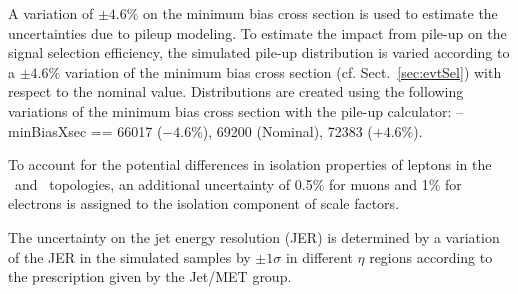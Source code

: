 A variation of $\pm 4.6\%$ on the minimum bias cross section is used to estimate the uncertainties due to pileup modeling.
To estimate the impact from pile-up on the signal selection efficiency, the simulated pile-up distribution is varied according to a $\pm 4.6\%$ variation of the minimum bias cross section (cf. Sect.~\ref{sec:evtSel}) with respect to the nominal value. 
Distributions are created using the following variations of the minimum bias cross section with the pile-up calculator: --minBiasXsec ==  66017 ($-4.6\%$), 69200 (Nominal), 72383 ($+4.6\%$).


To account for the potential differences in isolation properties of leptons in the \ttbar\ and \zjets\ topologies, an additional uncertainty of 0.5\% for muons and 1\% for electrons is assigned to the isolation component of scale factors.

The uncertainty on the jet energy resolution (JER) is determined by a variation of the JER in the simulated samples by $\pm 1\sigma$ in different $\eta$ regions according to the prescription given by the Jet/MET group.
